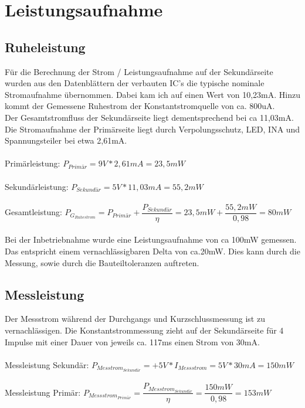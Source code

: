 \section{Leistungsaufnahme}

\subsection{Ruheleistung}
Für die Berechnung der Strom / Leistungsaufnahme auf der Sekundärseite wurden aus den Datenblättern der verbauten IC's die typische nominale Stromaufnahme übernommen. Dabei kam ich auf einen Wert von 10,23mA. Hinzu kommt der Gemessene Ruhestrom der Konstantstromquelle von ca. 800uA. 
\\
Der Gesamtstromfluss der Sekundärseite liegt dementsprechend bei ca 11,03mA.
\\
Die Stromaufnahme der Primärseite liegt durch Verpolungsschutz, LED, INA und Spannungsteiler bei etwa 2,61mA. 
\\
\\
Primärleistung: $P_{Primär} = 9V * 2,61mA = 23,5mW$
\\
\\
Sekundärleistung: $P_{Sekundär} = 5V * 11,03mA = 55,2mW$
\\
\\
Gesamtleistung: $P_{G_{Ruhestrom}} = P_{Primär} + \dfrac{P_{Sekundär}}{\eta} = 23,5mW + \dfrac{55,2mW}{0,98} = 80mW$
\\
\\
Bei der Inbetriebnahme wurde eine Leistungsaufnahme von ca 100mW gemessen. Das entspricht einem vernachlässigbaren Delta von ca.20mW. Dies kann durch die Messung, sowie durch die Bauteiltoleranzen auftreten.

\subsection{Messleistung}

Der Messstrom während der Durchgangs und Kurzschlussmessung ist zu vernachlässigen. Die Konstantstrommessung zieht auf der Sekundärseite für 4 Impulse mit einer Dauer von jeweils ca. 117ms einen Strom von 30mA.
\\
\\
Messleistung Sekundär: $P_{Messtrom_{Sekundär}} = +5V * I_{Messstrom} = 5V * 30mA = 150mW$
\\
\\
Messleistung Primär: $P_{Messstrom_{Primär}} = \dfrac{P_{Messtrom_{Sekundär}}}{\eta} = \dfrac{150mW}{0,98} = 153mW$


